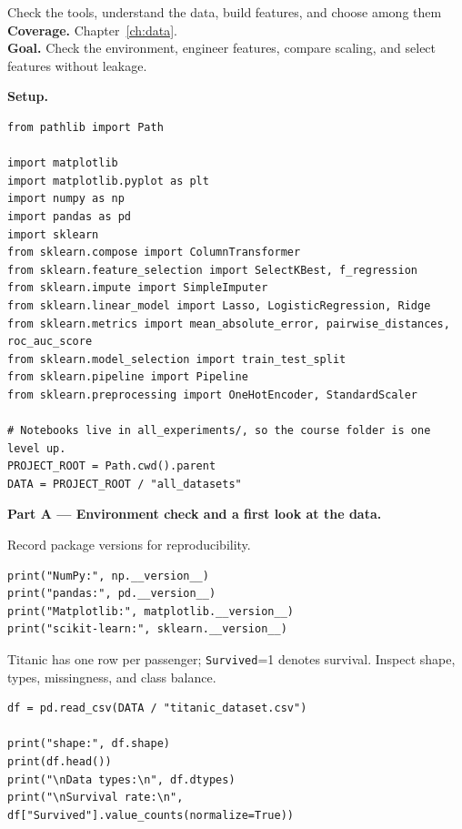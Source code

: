 
\begin{labproject}{Check the tools, understand the data, build features, and choose among them}
\textbf{Coverage.} Chapter~\ref{ch:data}.\\
\textbf{Goal.} Check the environment, engineer features, compare scaling, and select features without leakage.

\medskip\noindent\textbf{Setup.}\par
\begin{lstlisting}[style=utppython]
from pathlib import Path

import matplotlib
import matplotlib.pyplot as plt
import numpy as np
import pandas as pd
import sklearn
from sklearn.compose import ColumnTransformer
from sklearn.feature_selection import SelectKBest, f_regression
from sklearn.impute import SimpleImputer
from sklearn.linear_model import Lasso, LogisticRegression, Ridge
from sklearn.metrics import mean_absolute_error, pairwise_distances, roc_auc_score
from sklearn.model_selection import train_test_split
from sklearn.pipeline import Pipeline
from sklearn.preprocessing import OneHotEncoder, StandardScaler

# Notebooks live in all_experiments/, so the course folder is one level up.
PROJECT_ROOT = Path.cwd().parent
DATA = PROJECT_ROOT / "all_datasets"
\end{lstlisting}

\medskip\noindent\textbf{Part A --- Environment check and a first look at the data.}\par

Record package versions for reproducibility.

\begin{lstlisting}[style=utppython]
print("NumPy:", np.__version__)
print("pandas:", pd.__version__)
print("Matplotlib:", matplotlib.__version__)
print("scikit-learn:", sklearn.__version__)
\end{lstlisting}

Titanic has one row per passenger; \texttt{Survived}=1 denotes survival. Inspect shape, types, missingness, and class balance.

\begin{lstlisting}[style=utppython]
df = pd.read_csv(DATA / "titanic_dataset.csv")

print("shape:", df.shape)
print(df.head())
print("\nData types:\n", df.dtypes)
print("\nSurvival rate:\n", df["Survived"].value_counts(normalize=True))
\end{lstlisting}


\end{labproject}

